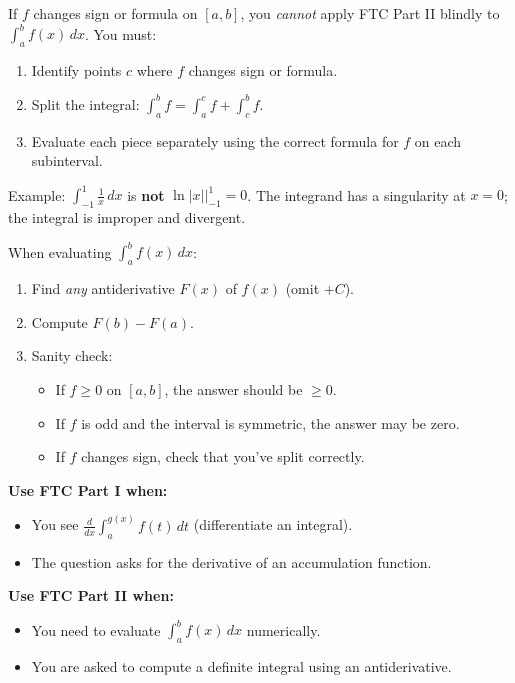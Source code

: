 \begin{commonmistake}[title={Common Mistake: Ignoring sign changes in the integrand}]
If $f$ changes sign or formula on $[a,b]$, you \emph{cannot} apply FTC Part II blindly to $\int_a^b f(x)\,dx$. You must:
\begin{enumerate}[label=(\arabic*)]
\item Identify points $c$ where $f$ changes sign or formula.
\item Split the integral: $\int_a^b f = \int_a^c f + \int_c^b f$.
\item Evaluate each piece separately using the correct formula for $f$ on each subinterval.
\end{enumerate}
Example: $\int_{-1}^1 \frac{1}{x}\,dx$ is \textbf{not} $\ln|x|\big|_{-1}^1 = 0$. The integrand has a singularity at $x=0$; the integral is improper and divergent.
\end{commonmistake}

\begin{examtip}[title={Exam Focus: FTC Part II workflow}]
When evaluating $\int_a^b f(x)\,dx$:
\begin{enumerate}[label=(\arabic*), leftmargin=*]
\item Find \emph{any} antiderivative $F(x)$ of $f(x)$ (omit $+C$).
\item Compute $F(b)-F(a)$.
\item Sanity check:
\begin{itemize}[leftmargin=2em]
\item If $f\ge 0$ on $[a,b]$, the answer should be $\ge 0$.
\item If $f$ is odd and the interval is symmetric, the answer may be zero.
\item If $f$ changes sign, check that you've split correctly.
\end{itemize}
\end{enumerate}
\end{examtip}

\begin{examtip}[title={Exam Focus: When to use Part I vs.\ Part II}]
\textbf{Use FTC Part I when:}
\begin{itemize}[leftmargin=*]
\item You see $\displaystyle \frac{d}{dx}\int_a^{g(x)} f(t)\,dt$ (differentiate an integral).
\item The question asks for the derivative of an accumulation function.
\end{itemize}
\textbf{Use FTC Part II when:}
\begin{itemize}[leftmargin=*]
\item You need to evaluate $\int_a^b f(x)\,dx$ numerically.
\item You are asked to compute a definite integral using an antiderivative.
\end{itemize}
\end{examtip}

